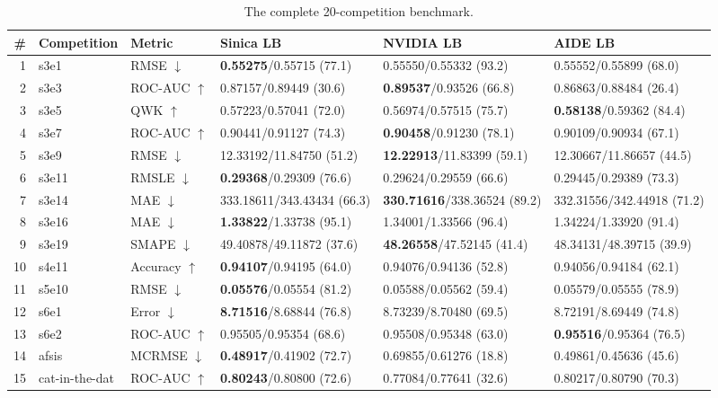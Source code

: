 \documentclass[11pt,a4paper]{article}
\newcommand{\dn}{\ensuremath{\downarrow}}
\newcommand{\up}{\ensuremath{\uparrow}}
\begin{document}
\begin{table}[H]
\centering\footnotesize
\setlength{\tabcolsep}{3pt}
\caption{The complete 20-competition benchmark.}
\label{tab:bench}
\begin{tabular}{@{}rll@{\hspace{14pt}}lll@{}}
\toprule
\# & \textbf{Competition} & \textbf{Metric} & \textbf{Sinica LB} & \textbf{NVIDIA LB} & \textbf{AIDE LB} \\
\midrule
1 & s3e1 & RMSE \dn & \textbf{0.55275}/0.55715 (77.1) & 0.55550/0.55332 (93.2) & 0.55552/0.55899 (68.0) \\
2 & s3e3 & ROC-AUC \up & 0.87157/0.89449 (30.6) & \textbf{0.89537}/0.93526 (66.8) & 0.86863/0.88484 (26.4) \\
3 & s3e5 & QWK \up & 0.57223/0.57041 (72.0) & 0.56974/0.57515 (75.7) & \textbf{0.58138}/0.59362 (84.4) \\
4 & s3e7 & ROC-AUC \up & 0.90441/0.91127 (74.3) & \textbf{0.90458}/0.91230 (78.1) & 0.90109/0.90934 (67.1) \\
5 & s3e9 & RMSE \dn & 12.33192/11.84750 (51.2) & \textbf{12.22913}/11.83399 (59.1) & 12.30667/11.86657 (44.5) \\
6 & s3e11 & RMSLE \dn & \textbf{0.29368}/0.29309 (76.6) & 0.29624/0.29559 (66.6) & 0.29445/0.29389 (73.3) \\
7 & s3e14 & MAE \dn & 333.18611/343.43434 (66.3) & \textbf{330.71616}/338.36524 (89.2) & 332.31556/342.44918 (71.2) \\
8 & s3e16 & MAE \dn & \textbf{1.33822}/1.33738 (95.1) & 1.34001/1.33566 (96.4) & 1.34224/1.33920 (91.4) \\
9 & s3e19 & SMAPE \dn & 49.40878/49.11872 (37.6) & \textbf{48.26558}/47.52145 (41.4) & 48.34131/48.39715 (39.9) \\
10 & s4e11 & Accuracy \up & \textbf{0.94107}/0.94195 (64.0) & 0.94076/0.94136 (52.8) & 0.94056/0.94184 (62.1) \\
11 & s5e10 & RMSE \dn & \textbf{0.05576}/0.05554 (81.2) & 0.05588/0.05562 (59.4) & 0.05579/0.05555 (78.9) \\
12 & s6e1 & Error \dn & \textbf{8.71516}/8.68844 (76.8) & 8.73239/8.70480 (69.5) & 8.72191/8.69449 (74.8) \\
13 & s6e2 & ROC-AUC \up & 0.95505/0.95354 (68.6) & 0.95508/0.95348 (63.0) & \textbf{0.95516}/0.95364 (76.5) \\
14 & afsis & MCRMSE \dn & \textbf{0.48917}/0.41902 (72.7) & 0.69855/0.61276 (18.8) & 0.49861/0.45636 (45.6) \\
15 & cat-in-the-dat & ROC-AUC \up & \textbf{0.80243}/0.80800 (72.6) & 0.77084/0.77641 (32.6) & 0.80217/0.80790 (70.3) \\

\end{tabular}
\end{table}
\end{document}
